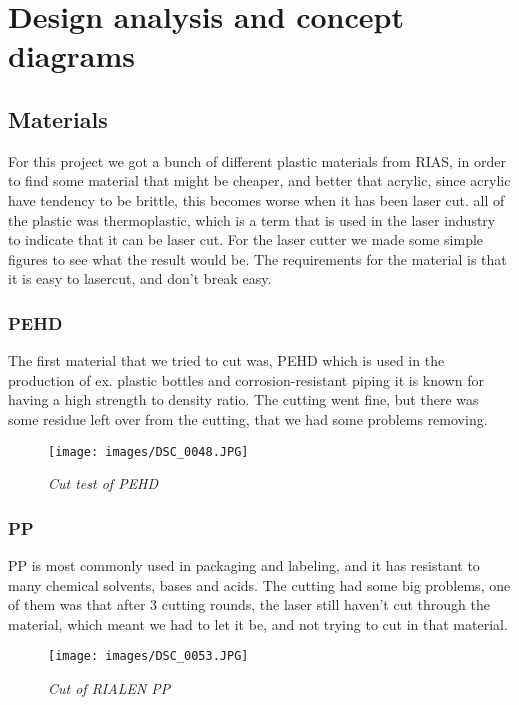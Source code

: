 \section{Design analysis and concept diagrams}

\subsection{Materials}
For this project we got a bunch of different plastic materials from RIAS, in order to find some material that might be cheaper, and better that acrylic, since acrylic have tendency to be brittle, this becomes worse when it has been laser cut.
all of the plastic was thermoplastic, which is a term that is used in the laser industry to indicate that it can be laser cut.
For the laser cutter we made some simple figures to see what the result would be.
The requirements for the material is that it is easy to lasercut, and don't break easy.
\subsubsection{PEHD}
The first material that we tried to cut was, PEHD which is used in the production of ex. plastic bottles and corrosion-resistant piping it is known for having a high strength to density ratio.
The cutting went fine, but there was some residue left over from the cutting, that we had some problems removing.
\begin{figure}[!h]
	\centering
	\texttt{[image: images/DSC\_0048.JPG]}
	\caption{\small {\it {Cut test of PEHD}}} \label{fig:explode}
\end{figure}
\FloatBarrier
\subsubsection{ PP}
 PP is most commonly used in packaging and labeling, and it has resistant to many chemical solvents, bases and acids.
The cutting had some big problems, one of them was that after 3 cutting rounds, the laser still haven't cut through the material, which meant we had to let it be, and not trying to cut in that material.
\begin{figure}[!h]
	\centering
	\texttt{[image: images/DSC\_0053.JPG]}
	\caption{\small {\it {Cut of RIALEN PP}}} \label{fig:explode}
\end{figure}
\FloatBarrier
